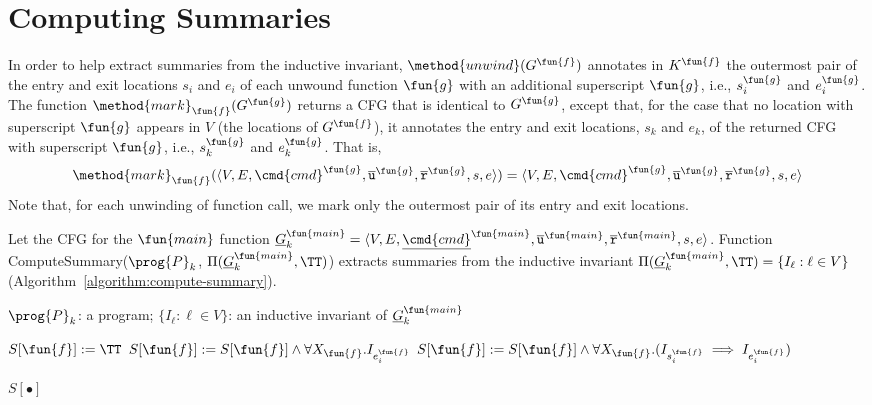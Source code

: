
\section{Computing Summaries}\label{sec:computing-summary}
In order to help extract summaries from the inductive invariant,
$\method{unwind}(G^\fun{f})$ annotates in $K^\fun{f}$ the outermost pair of the
entry and exit locations ${s_i}$ and ${e_i}$ of each unwound function $\fun{g}$
with an additional superscript $\fun{g}$, i.e., $s_i^\fun{g}$ and $e_i^\fun{g}$.
The function $\method{mark}_\fun{f}(G^\fun{g})$ returns a CFG that is identical
to $G^\fun{g}$, except that, for the case that no location with superscript
$\fun{g}$ appears in $V$ (the locations of $G^\fun{f}$), it annotates the entry
and exit locations, $s_k$ and $e_k$, of the returned CFG with superscript
$\fun{g}$, i.e., $s_k^\fun{g}$ and $e_k^\fun{g}$.
That is,
\[
\method{mark}_\fun{f}(\langle
V, E,\cmd{cmd}^\fun{g}, \overline{\texttt{u}}^\fun{g}, \overline{\texttt{r}}^\fun{g},s,e \rangle) =
\langle V, E,\cmd{cmd}^\fun{g}, \overline{\texttt{u}}^\fun{g}, \overline{\texttt{r}}^\fun{g},s,e \rangle
\]
Note that, for each unwinding of function call,
we mark only the outermost pair of its entry and exit locations.


Let the CFG for the $\fun{main}$ function $\underline{G}^{\fun{main}}_k = \langle V, E, \underline{\cmd{cmd}}^{\fun{main}}, \overline{\mathtt{u}}^{\fun{main}}, \overline{\mathtt{r}}^{\fun{main}},s,e \rangle$.
Function ComputeSummary($\prog{P}_k$, $\Pi (\underline{G}^{\fun{main}}_k, \TT)$)
extracts summaries from the inductive invariant
$\Pi (\underline{G}^{\fun{main}}_k, \TT)= \{ I_\ell : \ell \in V\}$
(Algorithm~\ref{algorithm:compute-summary}).

\begin{algorithm}
\begin{doublespace}
  \KwIn
  {
    $\prog{P}_k$: a program;
    $\{ I_\ell : \ell \in V \}$: an inductive invariant of $\underline{G}^{\fun{main}}_k$
  }

  { 
    $S[\fun{f}]:=\TT$\;
    {
      {
        $S[\fun{f}]:=S[\fun{f}]\wedge \forall X_\fun{f}. I_{e_i^\fun{f}}$
      }
      \Else
      {
        $S[\fun{f}]:=S[\fun{f}]\wedge \forall X_\fun{f}. (I_{s_i^\fun{f}} \implies I_{e_i^\fun{f}})$
      }
    }
    
  }
 
  \Return $S[\bullet]$\;
\end{doublespace}
  \caption{
  $\textmd{ComputeSummary}(\prog{P}_k, \Pi (\underline{G}^{\fun{main}}_k, \TT))$}
  \label{algorithm:compute-summary}
\end{algorithm}

